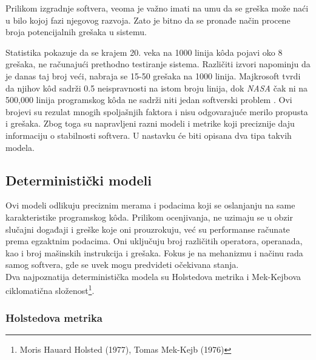 \documentclass[a4paper]{article}
\begin{document}
Prilikom izgradnje softvera, veoma je važno imati na umu da se greška može naći u bilo kojoj fazi njegovog razvoja. Zato je bitno da se pronađe način procene broja potencijalnih grešaka u sistemu.

Statistika pokazuje da se krajem 20. veka na 1000 linija k\^{o}da pojavi oko 8 grešaka, ne računajući prethodno testiranje sistema. Različiti izvori napominju da je danas taj broj veći, nabraja se 15-50 grešaka na 1000 linija. Majkrosoft tvrdi da njihov k\^{o}d sadrži 0.5 neispravnosti na istom broju linija, dok \emph{NASA} čak ni na 500,000 linija programskog k\^{o}da ne sadrži niti jedan softverski problem \cite{Statistika_prosek_gresaka}. Ovi brojevi su rezulat mnogih spoljašnjih faktora i nisu odgovarajuće merilo propusta i grešaka. Zbog toga su napravljeni razni modeli i metrike koji preciznije daju informaciju o stabilnosti softvera. U nastavku će biti opisana dva tipa takvih modela.\\


\subsection{Deterministički modeli}
\label{sec:deterministicki}

Ovi modeli odlikuju preciznim merama i podacima koji se oslanjanju na same karakteristike programskog k\^{o}da. Prilikom ocenjivanja, ne uzimaju se u obzir slučajni događaji i greške koje oni prouzrokuju, već su performanse računate prema egzaktnim podacima. Oni uključuju broj različitih operatora, operanada, kao i broj mašinskih instrukcija i grešaka. Fokus je na mehanizmu i načinu rada samog softvera, gde se uvek mogu predvideti očekivana stanja.\\
Dva najpoznatija deterministička modela su Holstedova metrika i Mek-Kejbova ciklomatična složenost\footnote{ Moris Hauard Holsted (1977), Tomas Mek-Kejb (1976)}.

\subsubsection{Holstedova metrika}
\label{subsec:holsted}
\end{document}
